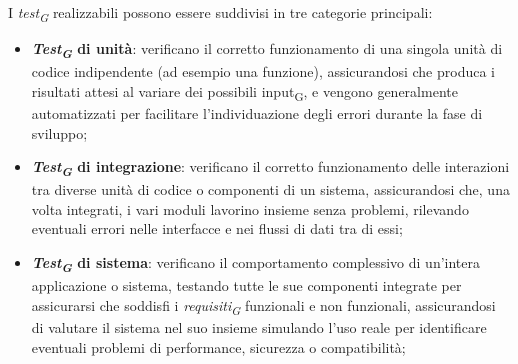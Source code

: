 I \textit{test\textsubscript{G}} realizzabili possono essere suddivisi in tre categorie principali:
\begin{itemize}
    \item \textbf{\textit{Test\textsubscript{G}} di unità}: verificano il corretto funzionamento di una singola unità di codice indipendente (ad esempio una funzione), assicurandosi che produca i risultati attesi al variare dei possibili input\textsubscript{G}, e vengono generalmente automatizzati per facilitare l'individuazione degli errori durante la fase di sviluppo;
    \item \textbf{\textit{Test\textsubscript{G}} di integrazione}: verificano il corretto funzionamento delle interazioni tra diverse unità di codice o componenti di un sistema, assicurandosi che, una volta integrati, i vari moduli lavorino insieme senza problemi, rilevando eventuali errori nelle interfacce e nei flussi di dati tra di essi;
    \item \textbf{\textit{Test\textsubscript{G}} di sistema}: verificano il comportamento complessivo di un'intera applicazione o sistema, testando tutte le sue componenti integrate per assicurarsi che soddisfi i \textit{requisiti\textsubscript{G}} funzionali e non funzionali, assicurandosi di valutare il sistema nel suo insieme simulando l'uso reale per identificare eventuali problemi di performance, sicurezza o compatibilità;
\end{itemize}

